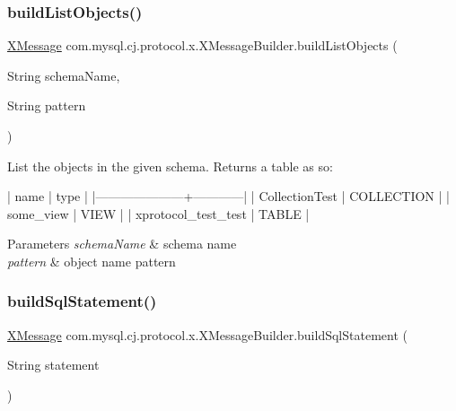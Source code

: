 \subsubsection{\texorpdfstring{build\+List\+Objects()}{buildListObjects()}}
{\footnotesize\ttfamily \mbox{\hyperlink{classcom_1_1mysql_1_1cj_1_1protocol_1_1x_1_1_x_message}{X\+Message}} com.\+mysql.\+cj.\+protocol.\+x.\+X\+Message\+Builder.\+build\+List\+Objects (\begin{DoxyParamCaption}\item[{String}]{schema\+Name,  }\item[{String}]{pattern }\end{DoxyParamCaption})}

List the objects in the given schema. Returns a table as so\+:


\begin{DoxyPre}
| name                | type       |
|---------------------+------------|
| CollectionTest      | COLLECTION |
| some\_view           | VIEW       |
| xprotocol\_test\_test | TABLE      |
\end{DoxyPre}



\begin{DoxyParams}{Parameters}
{\em schema\+Name} & schema name \\
\hline
{\em pattern} & object name pattern \\
\hline
\end{DoxyParams}
\mbox{\label{classcom_1_1mysql_1_1cj_1_1protocol_1_1x_1_1_x_message_builder_a60e482092bcdce0fd60ecd466daed306}} 
\subsubsection{\texorpdfstring{build\+Sql\+Statement()}{buildSqlStatement()}\hspace{0.1cm}{\footnotesize\ttfamily [1/2]}}
{\footnotesize\ttfamily \mbox{\hyperlink{classcom_1_1mysql_1_1cj_1_1protocol_1_1x_1_1_x_message}{X\+Message}} com.\+mysql.\+cj.\+protocol.\+x.\+X\+Message\+Builder.\+build\+Sql\+Statement (\begin{DoxyParamCaption}\item[{String}]{statement }\end{DoxyParamCaption})}


